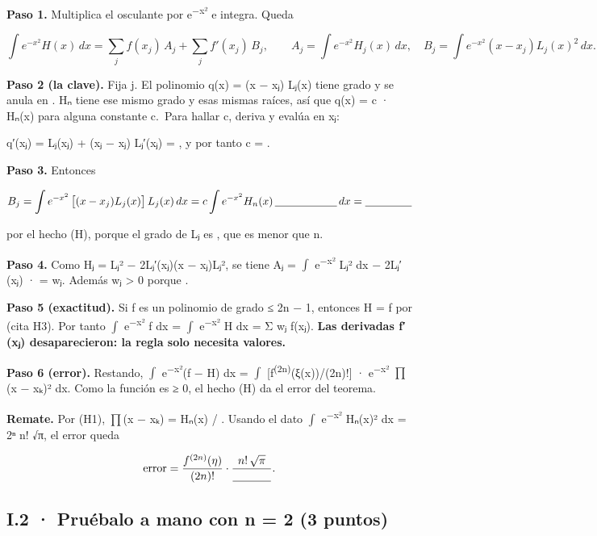 \textbf{Paso 1.} Multiplica el osculante por e\textsuperscript{−x²} e integra. Queda

\[\int e^{-x^2}H(x)\,dx=\sum_{j} f(x_j)\,A_j+\sum_{j} f'(x_j)\,B_j,\qquad A_j=\int e^{-x^2}H_j(x)\,dx,\quad B_j=\int e^{-x^2}(x-x_j)L_j(x)^2\,dx .\]

\textbf{Paso 2 (la clave).} Fija j. El polinomio q(x) = (x − xⱼ) Lⱼ(x) tiene grado  y se anula en . Hₙ tiene ese mismo grado y esas mismas raíces, así que q(x) = c · Hₙ(x) para alguna constante c.~Para hallar c, deriva y evalúa en xⱼ:

q′(xⱼ) = Lⱼ(xⱼ) + (xⱼ − xⱼ) Lⱼ′(xⱼ) = , y por tanto c = .

\textbf{Paso 3.} Entonces

\[B_j=\int e^{-x^2}\,\big[(x-x_j)L_j(x)\big]\,L_j(x)\,dx = c\int e^{-x^2}H_n(x)\,\underline{\hspace{2cm}}\,dx=\underline{\hspace{1.5cm}}\]

por el hecho (H), porque el grado de Lⱼ es , que es menor que n.

\textbf{Paso 4.} Como Hⱼ = Lⱼ² − 2Lⱼ′(xⱼ)(x − xⱼ)Lⱼ², se tiene Aⱼ = \ensuremath{\int} e\textsuperscript{−x²} Lⱼ² dx − 2Lⱼ′(xⱼ) ·  = wⱼ. Además wⱼ \textgreater{} 0 porque .

\textbf{Paso 5 (exactitud).} Si f es un polinomio de grado ≤ 2n − 1, entonces H = f por  (cita H3). Por tanto \ensuremath{\int} e\textsuperscript{−x²} f dx = \ensuremath{\int} e\textsuperscript{−x²} H dx = Σ wⱼ f(xⱼ). \textbf{Las derivadas f′(xⱼ) desaparecieron: la regla solo necesita valores.}

\textbf{Paso 6 (error).} Restando, \ensuremath{\int} e\textsuperscript{−x²}(f − H) dx = \ensuremath{\int} {[}f\textsuperscript{(2n)}(ξ(x))/(2n)!{]} · e\textsuperscript{−x²} \ensuremath{\prod}(x − xₖ)² dx. Como la función  es ≥ 0, el hecho (H) da el error del teorema.

\textbf{Remate.} Por (H1), \ensuremath{\prod}(x − xₖ) = Hₙ(x) / . Usando el dato \ensuremath{\int} e\textsuperscript{−x²} Hₙ(x)² dx = 2ⁿ n! √π, el error queda

\[\text{error}=\frac{f^{(2n)}(\eta)}{(2n)!}\cdot\frac{n!\,\sqrt{\pi}}{\underline{\hspace{1.2cm}}} .\]

\subsection{I.2 · Pruébalo a mano con n = 2 (3 puntos)}

